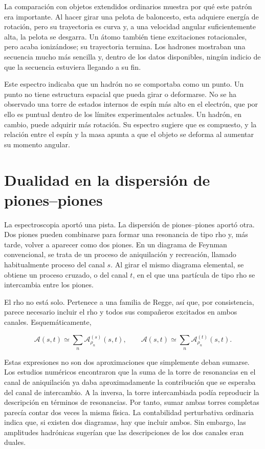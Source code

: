 La comparación con objetos extendidos ordinarios muestra por qué este patrón era importante.
Al hacer girar una pelota de baloncesto, esta adquiere energía de rotación, pero su trayectoria
es curva y, a una velocidad angular suficientemente alta, la pelota se desgarra. Un átomo también tiene excitaciones rotacionales, pero acaba ionizándose; su trayectoria termina. Los
hadrones mostraban una secuencia mucho más sencilla y, dentro de los datos disponibles, ningún indicio de que la secuencia estuviera llegando a su fin.

Este espectro indicaba que un hadrón no se comportaba como un punto. Un punto no tiene
estructura espacial que pueda girar o deformarse. No se ha observado una torre de estados internos de espín más alto en el electrón, que por ello es puntual dentro de los límites experimentales actuales. Un hadrón, en cambio, puede adquirir más rotación. Su espectro sugiere que es compuesto, y la relación entre el espín y la masa apunta a que el objeto se deforma al aumentar su momento angular.

\section{Dualidad en la dispersión de piones--piones}

La espectroscopia aportó una pista. La dispersión de piones--piones aportó otra. Dos
piones pueden combinarse para formar una resonancia de tipo rho y, más tarde, volver a aparecer como dos
piones. En un diagrama de Feynman convencional, se trata de un proceso de aniquilación y
recreación, llamado habitualmente proceso del canal \(s\). Al girar el mismo diagrama elemental, se obtiene un proceso cruzado, o del canal \(t\), en el que una partícula de tipo rho se intercambia entre los piones.

El rho no está solo. Pertenece a una familia de Regge, así que, por consistencia, parece necesario incluir el rho y todos sus compañeros excitados en ambos canales. Esquemáticamente,

\begin{equation}
  \mathcal A(s,t)\simeq
  \sum_n \mathcal A^{(s)}_{\rho_n}(s,t),
  \qquad
  \mathcal A(s,t)\simeq
  \sum_n \mathcal A^{(t)}_{\rho_n}(s,t).
  \label{eq:l01-channel-sums}
\end{equation}

Estas expresiones no son dos aproximaciones que simplemente deban sumarse.
Los estudios numéricos encontraron que la suma de la torre de resonancias en el
canal de aniquilación ya daba aproximadamente la contribución que se esperaba
del canal de intercambio. A la inversa, la torre intercambiada podía reproducir
la descripción en términos de resonancias. Por tanto, sumar ambas torres completas parecía
contar dos veces la misma física. La contabilidad perturbativa ordinaria indica que, si existen
dos diagramas, hay que incluir ambos. Sin embargo, las amplitudes hadrónicas
sugerían que las descripciones de los dos canales eran duales.


